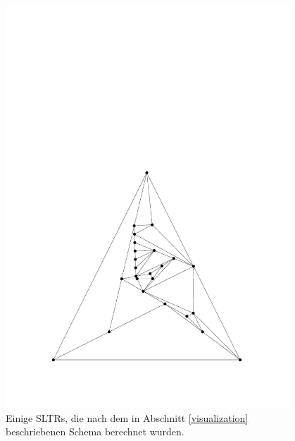 \begin{figure}
\begin{minipage}{0.48\textwidth}
    \includegraphics[width=0.95\textwidth]{vis_25_2.pdf}
  \end{minipage}
\caption{Einige SLTRs, die nach dem in Abschnitt \ref{visualization} beschriebenen Schema berechnet wurden.}
\label{examples_vis}
\end{figure}

